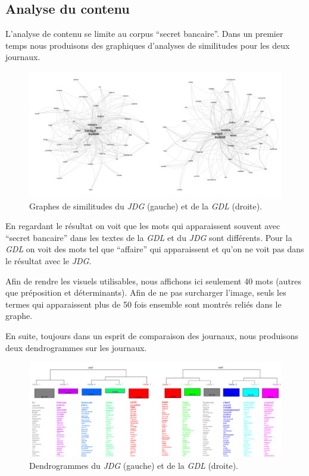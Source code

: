 \documentclass[11pt]{article}
\begin{document}
\hypertarget{analyse-du-contenu}{%
\subsection{Analyse du contenu}\label{analyse-du-contenu}}

L'analyse de contenu se limite au corpus ``secret bancaire''. Dans un
premier temps nous produisons des graphiques d'analyses de similitudes
pour les deux journaux.

\begin{figure}
\centering
\includegraphics[width=1\textwidth ]{methodology/similitude.png}
\caption{Graphes de similitudes du \emph{JDG} (gauche) et de la
\emph{GDL} (droite).}
\end{figure}

En regardant le résultat on voit que les mots qui apparaissent souvent
avec ``secret bancaire'' dans les textes de la \emph{GDL} et du
\emph{JDG} sont différents. Pour la \emph{GDL} on voit des mots tel que
``affaire'' qui apparaissent et qu'on ne voit pas dans le résultat avec
le \emph{JDG}.

Afin de rendre les visuels utilisables, nous affichons ici seulement 40
mots (autres que préposition et déterminants). Afin de ne pas surcharger
l'image, seuls les termes qui apparaissent plus de 50 fois ensemble sont
montrés reliés dans le graphe.

En suite, toujours dans un esprit de comparaison des journaux, nous
produisons deux dendrogrammes sur les journaux.

\begin{figure}
\centering
\includegraphics[width=1\textwidth ]{methodology/dendrogram.png}
\caption{Dendrogrammes du \emph{JDG} (gauche) et de la \emph{GDL}
(droite).}
\end{figure}
\end{document}
